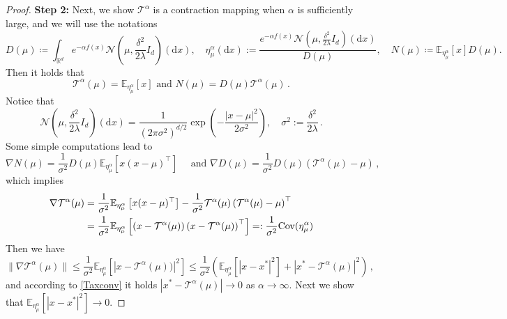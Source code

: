 \documentclass[reqno]{amsart}
\numberwithin{algorithm}{section}
\newcommand{\diff}{\mathrm{d}}
\newcommand{\RR}{\mathbb{R}}
\newcommand{\EE}{{\mathbb E}}
\newcommand{\mc}[1]{\mathcal{#1}}
\begin{document}
{\begin{proof}
\textbf{Step 2:} Next, we show $\mathcal{T}^\alpha$ is a contraction mapping when $\alpha$ is sufficiently large, and we will use the notations
\begin{equation*}
    D(\mu) \coloneqq \int_{\RR^d}e^{-\alpha f(x)}\mc{N}(\mu,\frac{\delta^2}{2\lambda}I_d)(\diff x), \quad\eta^\alpha_{\mu}(\diff x):=\frac{ e^{-\alpha f(x)}\mc{N}(\mu,\frac{\delta^2}{2\lambda}I_d)(\diff x)}{D(\mu)}, \quad N(\mu) \coloneqq \EE_{\eta^\alpha_{\mu}}[x]D(\mu).
\end{equation*}
Then it holds that
\begin{equation}
    \mc{T}^\alpha(\mu)=\EE_{\eta^\alpha_{\mu}}[x]\mbox{ and }N(\mu)=D(\mu)\mc{T}^\alpha(\mu)\,.
\end{equation}
Notice that
\begin{equation*}
    \mc{N}\left(\mu,\frac{\delta^2}{2\lambda}I_d\right)(\diff x)=\frac{1}{(2\pi\sigma^2)^{d/2}}\exp\left(-\frac{|x-\mu|^2}{2\sigma^2}\right),\quad \sigma^2:=\frac{\delta^2}{2\lambda}\,.
\end{equation*}
Some simple computations lead to
\begin{equation}
    \nabla N(\mu)=\frac{1}{\sigma^2}D(\mu)\EE_{\eta^\alpha_{\mu}}[x(x-\mu)^\top]\quad \mbox{ and }\nabla D(\mu)=\frac{1}{\sigma^2} D(\mu)(\mc{T}^\alpha(\mu)-\mu)\,,
\end{equation}
which implies 
\begin{align}
    \nabla \mathcal{T}^\alpha(\mu)&=\frac{1}{\sigma^2}\EE_{\eta^\alpha_{\mu}}\left[x(x-\mu)^\top\right]-\frac{1}{\sigma^2}\mc{T}^\alpha(\mu)\left(\mc{T}^\alpha(\mu)-\mu\right)^\top\notag\\
    &=\frac{1}{\sigma^2}\EE_{\eta^\alpha_{\mu}}\left[(x-\mc{T}^\alpha(\mu))\left(x-\mc{T}^\alpha(\mu)\right)^\top\right]=:\frac{1}{\sigma^2} \mbox{Cov}(\eta^\alpha_{\mu})
\end{align}
Then we have
\begin{equation}\label{57}
    \|\nabla \mathcal{T}^\alpha(\mu)\|\leq \frac{1}{\sigma^2}\EE_{\eta^\alpha_{\mu}}\left[|x-\mc{T}^\alpha(\mu))|^2\right]\leq \frac{1}{\sigma^2}\left(\EE_{\eta^\alpha_{\mu}}[|x-x^*|^2]+|x^*-\mc{T}^\alpha(\mu)|^2\right)\,,
\end{equation}
and  according to \eqref{Taxconv} it holds $|x^*-\mc{T}^\alpha(\mu)|\to 0$ as $\alpha\to\infty$. Next we show that $\EE_{\eta^\alpha_{\mu}}[|x-x^*|^2]\to 0$.


\end{proof}}
\end{document}
